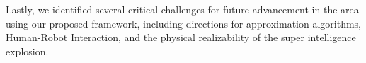 \documentclass[11pt]{article}
\begin{document}
Lastly, we identified several critical challenges for future advancement in the area using our proposed framework, including directions for approximation algorithms, Human-Robot Interaction, and the physical realizability of the super intelligence explosion.


%
%
%
%
%





\end{document}
